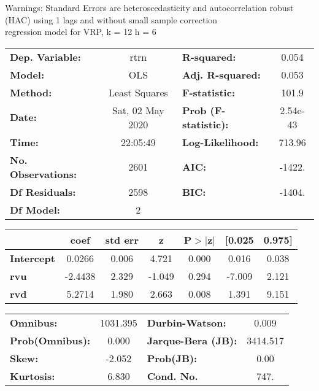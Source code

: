 Warnings: \newline
 [1] Standard Errors are heteroscedasticity and autocorrelation robust (HAC) using 1 lags and without small sample correction\\ 

regression model for VRP, k = 12 h = 6\begin{center}
\begin{tabular}{lclc}
\toprule
\textbf{Dep. Variable:}    &       rtrn       & \textbf{  R-squared:         } &     0.054   \\
\textbf{Model:}            &       OLS        & \textbf{  Adj. R-squared:    } &     0.053   \\
\textbf{Method:}           &  Least Squares   & \textbf{  F-statistic:       } &     101.9   \\
\textbf{Date:}             & Sat, 02 May 2020 & \textbf{  Prob (F-statistic):} &  2.54e-43   \\
\textbf{Time:}             &     22:05:49     & \textbf{  Log-Likelihood:    } &    713.96   \\
\textbf{No. Observations:} &        2601      & \textbf{  AIC:               } &    -1422.   \\
\textbf{Df Residuals:}     &        2598      & \textbf{  BIC:               } &    -1404.   \\
\textbf{Df Model:}         &           2      & \textbf{                     } &             \\
\bottomrule
\end{tabular}
\begin{tabular}{lcccccc}
                   & \textbf{coef} & \textbf{std err} & \textbf{z} & \textbf{P$> |$z$|$} & \textbf{[0.025} & \textbf{0.975]}  \\
\midrule
\textbf{Intercept} &       0.0266  &        0.006     &     4.721  &         0.000        &        0.016    &        0.038     \\
\textbf{rvu}       &      -2.4438  &        2.329     &    -1.049  &         0.294        &       -7.009    &        2.121     \\
\textbf{rvd}       &       5.2714  &        1.980     &     2.663  &         0.008        &        1.391    &        9.151     \\
\bottomrule
\end{tabular}
\begin{tabular}{lclc}
\textbf{Omnibus:}       & 1031.395 & \textbf{  Durbin-Watson:     } &    0.009  \\
\textbf{Prob(Omnibus):} &   0.000  & \textbf{  Jarque-Bera (JB):  } & 3414.517  \\
\textbf{Skew:}          &  -2.052  & \textbf{  Prob(JB):          } &     0.00  \\
\textbf{Kurtosis:}      &   6.830  & \textbf{  Cond. No.          } &     747.  \\
\bottomrule
\end{tabular}
\end{center}

